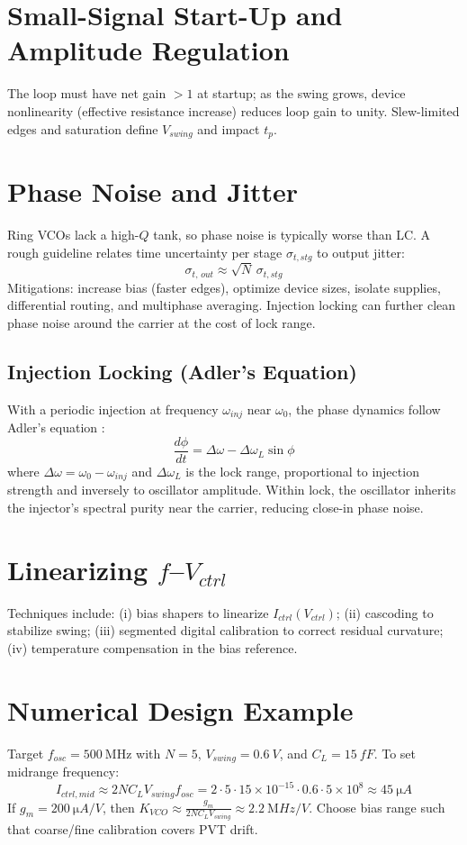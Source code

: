 \section{Small-Signal Start-Up and Amplitude Regulation}
The loop must have net gain $>1$ at startup; as the swing grows, device nonlinearity (effective resistance increase) reduces loop gain to unity. Slew-limited edges and saturation define \(V_{swing}\) and impact \(t_p\).

\section{Phase Noise and Jitter}
Ring VCOs lack a high-\(Q\) tank, so phase noise is typically worse than LC. A rough guideline relates time uncertainty per stage \(\sigma_{t,stg}\) to output jitter:
\[
 \sigma_{t,\,out} \approx \sqrt{N}\,\sigma_{t,stg}
\]
Mitigations: increase bias (faster edges), optimize device sizes, isolate supplies, differential routing, and multiphase averaging. Injection locking can further clean phase noise around the carrier at the cost of lock range.

\subsection*{Injection Locking (Adler's Equation)}
With a periodic injection at frequency \(\omega_{inj}\) near \(\omega_0\), the phase dynamics follow Adler's equation \cite{adler1946}:
\[
 \frac{d\phi}{dt} = \Delta\omega - \Delta\omega_L \sin\phi
\]
where \(\Delta\omega = \omega_0 - \omega_{inj}\) and \(\Delta\omega_L\) is the lock range, proportional to injection strength and inversely to oscillator amplitude. Within lock, the oscillator inherits the injector's spectral purity near the carrier, reducing close-in phase noise.

\section{Linearizing \(f\)–\(V_{ctrl}\)}
Techniques include: (i) bias shapers to linearize \(I_{ctrl}(V_{ctrl})\); (ii) cascoding to stabilize swing; (iii) segmented digital calibration to correct residual curvature; (iv) temperature compensation in the bias reference.

\section{Numerical Design Example}
Target \(f_{osc}=\SI{500}{\mega\hertz}\) with \(N=5\), \(V_{swing}=\SI{0.6}{V}\), and \(C_L=\SI{15}{fF}\). To set midrange frequency:
\[
 I_{ctrl,mid} \approx 2 N C_L V_{swing} f_{osc} = 2\cdot 5\cdot 15\times10^{-15}\cdot 0.6\cdot 5\times10^{8} \approx \SI{45}{\micro A}
\]
If \(g_m=\SI{200}{\micro A/V}\), then \(K_{VCO}\approx \tfrac{g_m}{2 N C_L V_{swing}} \approx \SI{2.2}{\mega Hz/V}\). Choose bias range such that coarse/fine calibration covers PVT drift.


